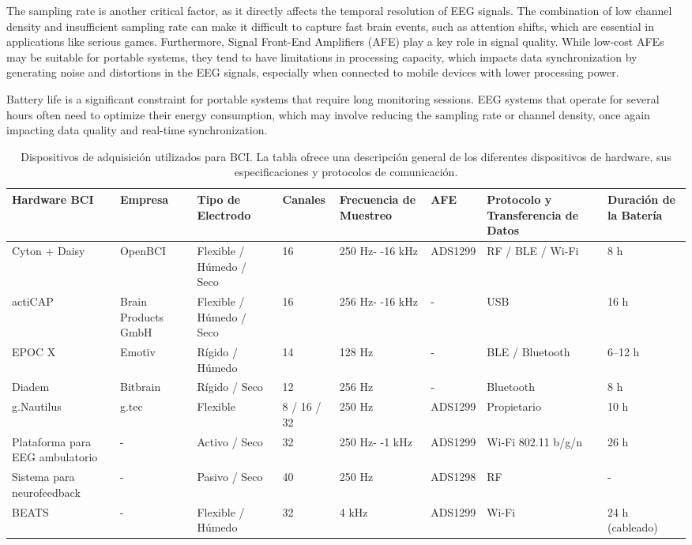 The sampling rate is another critical factor, as it directly affects the temporal resolution of EEG signals. The combination of low channel density and insufficient sampling rate can make it difficult to capture fast brain events, such as attention shifts, which are essential in applications like serious games. Furthermore, Signal Front-End Amplifiers (AFE) \cite{devi2022survey} play a key role in signal quality. While low-cost AFEs may be suitable for portable systems, they tend to have limitations in processing capacity, which impacts data synchronization by generating noise and distortions in the EEG signals, especially when connected to mobile devices with lower processing power.

Battery life \cite{niso2023wireless} is a significant constraint for portable systems that require long monitoring sessions. EEG systems that operate for several hours often need to optimize their energy consumption, which may involve reducing the sampling rate or channel density, once again impacting data quality and real-time synchronization.


\begin{table}[H]
    \caption{Dispositivos de adquisición utilizados para BCI. La tabla ofrece una descripción general de los diferentes dispositivos de hardware, sus especificaciones y protocolos de comunicación.}
    \label{table:bci_hardware}
    \centering
    \begin{tabular}{|p{2cm}|p{1.5cm}|p{1.6cm}|p{1.6cm}|p{1.7cm}|p{1.4cm}|p{1.8cm}|p{1.4cm}|}
        \hline
        \textbf{Hardware BCI} & \textbf{Empresa} & \textbf{Tipo de Electrodo} & \textbf{Canales} & \textbf{Frecuencia de Muestreo} & \textbf{AFE} & \textbf{Protocolo y Transferencia de Datos} & \textbf{Duración de la Batería} \\ \hline
        Cyton + Daisy \cite{OpenBCI_CytonDaisy} & OpenBCI & Flexible / Húmedo / Seco & 16 & 250 Hz- -16 kHz & ADS1299 & RF / BLE / Wi-Fi & 8 h \\ \hline
        actiCAP \cite{BrainProducts_ActiCap} & Brain Products GmbH & Flexible / Húmedo / Seco & 16 & 256 Hz- -16 kHz & - & USB & 16 h \\ \hline
        EPOC X \cite{Emotiv_EPOCX} & Emotiv & Rígido / Húmedo & 14 & 128 Hz & - & BLE / Bluetooth & 6--12 h \\ \hline
        Diadem \cite{Bitbrain_Diadem} & Bitbrain & Rígido / Seco & 12 & 256 Hz & - & Bluetooth & 8 h \\ \hline
        g.Nautilus \cite{Gtec_GNautilusProFlexible} & g.tec & Flexible & 8 / 16 / 32 & 250 Hz & ADS1299 & Propietario & 10 h \\ \hline
        Plataforma para EEG ambulatorio \cite{pinho2014wireless} & - & Activo / Seco & 32 & 250 Hz- -1 kHz & ADS1299 & Wi-Fi 802.11 b/g/n & 26 h \\ \hline
        Sistema para neurofeedback \cite{Totev2023} & - & Pasivo / Seco & 40 & 250 Hz & ADS1298 & RF & - \\ \hline
        BEATS \cite{Beats} & - & Flexible / Húmedo & 32 & 4 kHz & ADS1299 & Wi-Fi & 24 h (cableado) \\ \hline
    \end{tabular}
\end{table}


